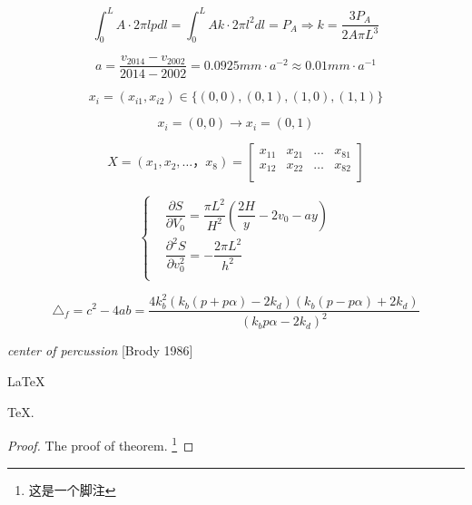 \documentclass{mcmthesis}
\begin{document}
\begin{equation}
  \int_0^L A\cdot 2\pi lpdl = \int_0^L Ak\cdot 2\pi l^2 dl 
  =P_A \Rightarrow k=\dfrac{3P_A}{2A\pi L^3}
\end{equation}

\begin{equation}
  a=\dfrac{v_{2014}-v_{2002}}{2014-2002} = 0.0925 mm\cdot a^{-2} \approx 0.01 mm\cdot a^{-1}
\end{equation}

\begin{equation}
  x_i=(x_{i1},x_{i2}) \in \{(0,0),(0,1),(1,0),(1,1)\}
\end{equation}

\begin{equation}
  x_i =(0,0) \to x_i =(0,1)
\end{equation}

\begin{equation}
  X=(x_1,x_2,…，x_8)=
  \begin{bmatrix}
    x_{11} & x_{21} &\dots &x_{81}\\
    x_{12} & x_{22} &\dots &x_{82}\\
  \end{bmatrix}
\end{equation}

\begin{equation}
  \left\{
  \begin{aligned}   %
  &\dfrac{\partial S}{\partial V_0} = \dfrac{\pi L^2}{H^2} (\dfrac{2H}{y}-2v_0-ay)\\ 
  &\dfrac{\partial ^2 S}{\partial v_0^2}=-\dfrac{2\pi L^2}{h^2}\\
  \end{aligned}
  \right.
\end{equation}

\begin{equation}
  \triangle_f = c^2 - 4ab = \dfrac{4k_b^2 (k_b(p+p\alpha)-2k_d)(k_b(p-p\alpha)+2k_d) }{(k_b p\alpha - 2k_d)^2}
\end{equation}

\emph{center of percussion} [Brody 1986]

\begin{Theorem}    %
\label{thm:latex}
\LaTeX
\end{Theorem}
\begin{Lemma} 
\label{thm:tex}
\TeX .
\end{Lemma}
\begin{proof}
The proof of theorem. \footnote{这是一个脚注}   %
\end{proof}
\end{document}
